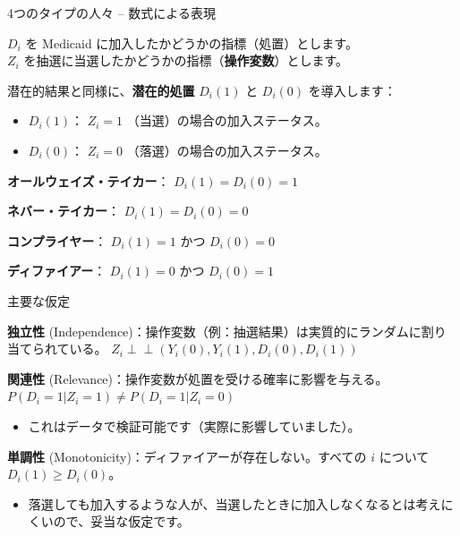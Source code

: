 \documentclass[11pt,handout]{beamer}
\newenvironment{wideitemize}{\itemize\addtolength{\itemsep}{10pt}}{\enditemize}
\newcommand{\indep}{\perp\!\!\!\!\perp}
\begin{document}
\begin{frame}{4つのタイプの人々 -- 数式による表現}
	
		
	\begin{wideitemize}
		\item
		$D_i$ を Medicaid に加入したかどうかの指標（処置）とします。\\
		$Z_i$ を抽選に当選したかどうかの指標（\textbf{操作変数}）とします。
		
		\pause
		\item
		潜在的結果と同様に、\textbf{潜在的処置} $D_i(1)$ と $D_i(0)$ を導入します：
			\begin{itemize}
				\item 
				$D_i(1)$： $Z_i=1$ （当選）の場合の加入ステータス。
				
				\item
				$D_i(0)$： $Z_i=0$ （落選）の場合の加入ステータス。
				
			\end{itemize}
		

		\pause
		\item
		\textbf{オールウェイズ・テイカー}： $D_i(1) = D_i(0) = 1$
		
		\pause
		\item  \textbf{ネバー・テイカー}： $D_i(1) = D_i(0) = 0$
			
		
		\pause
		\item \textbf{コンプライヤー}： $D_i(1) = 1$ かつ $D_i(0) = 0$
		
		\pause
		\item \textbf{ディファイアー}： $D_i(1) = 0$ かつ $D_i(0) = 1$
			
	\end{wideitemize}
	
\end{frame}



\begin{frame}{主要な仮定}
	\begin{wideitemize}
	\item
	\textbf{独立性} (Independence)：操作変数（例：抽選結果）は実質的にランダムに割り当てられている。 $Z_i \indep (Y_i(0),Y_i(1), D_i(0), D_i(1))$
	
	\pause
	\item
	\textbf{関連性} (Relevance)：操作変数が処置を受ける確率に影響を与える。 $P(D_i = 1 | Z_i = 1) \neq P(D_i = 1 | Z_i = 0)$
		\begin{itemize}
			\item 
			これはデータで検証可能です（実際に影響していました）。
		\end{itemize}
	
	\item
	\textbf{単調性} (Monotonicity)：ディファイアーが存在しない。すべての $i$ について $D_i(1) \geq D_i(0)$。
			\begin{itemize}
				\item 
				落選しても加入するような人が、当選したときに加入しなくなるとは考えにくいので、妥当な仮定です。
			\end{itemize}

	\end{wideitemize}	
\end{frame}
\end{document}
